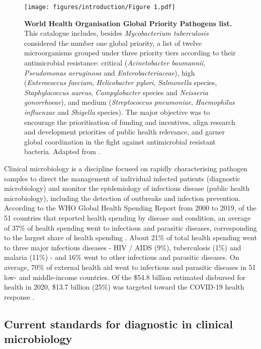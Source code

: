 \begin{figure}[h!]
\centering
\texttt{[image: figures/introduction/Figure 1.pdf]}
\caption{\textbf{World Health Organisation Global Priority Pathogens list.} This catalogue includes, besides \textit{Mycobacterium tuberculosis} considered the number one global priority, a list of twelve microorganisms grouped under three priority tiers according to their antimicrobial resistance: critical (\textit{Acinetobacter baumannii}, \textit{Pseudomonas aeruginosa} and \textit{Enterobacteriaceae}), high (\textit{Enterococcus faecium}, \textit{Helicobacter pylori}, \textit{Salmonella} species, \textit{Staphylococcus aureus}, \textit{Campylobacter} species and \textit{Neisseria gonorrhoeae}), and medium (\textit{Streptococcus pneumoniae}, \textit{Haemophilus influenzae} and \textit{Shigella} species). The major objective was to encourage the prioritisation of funding and incentives, align research and development priorities of public health relevance, and garner global coordination in the fight against antimicrobial resistant bacteria. Adapted from \cite{world_health_organization_prioritization_2017}.}
\label{fig:figure1}
\end{figure}

Clinical microbiology is a discipline focused on rapidly characterising pathogen samples to direct the management of individual infected patients (diagnostic microbiology) and monitor the epidemiology of infectious disease (public health microbiology), including the detection of outbreaks and infection prevention. 
According to the \ac{WHO} Global Health Spending Report from 2000 to 2019, of the 51 countries that reported health spending by disease and condition, an average of 37\% of health spending went to infectious and parasitic diseases, corresponding to the largest share of health spending \citep{world_health_organization_global_2021}. 
About 21\% of total health spending went to three major infectious diseases - HIV / AIDS (9\%), tuberculosis (1\%) and malaria (11\%) - and 16\% went to other infectious and parasitic diseases. 
On average, 70\% of external health aid went to infectious and parasitic diseases in 51 low- and middle-income countries. 
Of the \$54.8 billion estimated disbursed for health in 2020, \$13.7 billion (25\%) was targeted toward the COVID-19 health response \citep{micah_tracking_2021}.

\subsection{Current standards for diagnostic in clinical microbiology} \label{ssec:_intro_current_standards}

